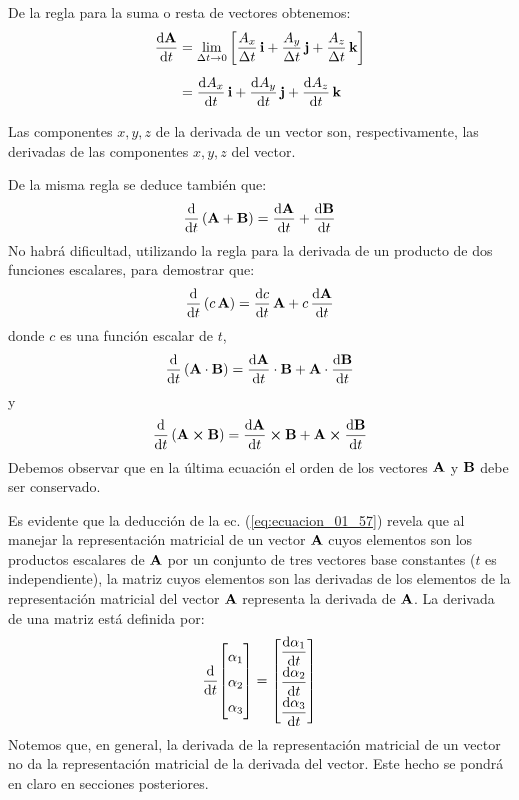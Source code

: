 \documentclass[12pt]{article}
\begin{document}
De la regla para la suma o resta de vectores obtenemos:
\begin{align}
\begin{aligned}
    \dv{\vb{A}}{t} &= \lim_{\Delta t \to 0} \left[ \dfrac{A_{x}}{\Delta t} \, \vb{i} + \dfrac{A_{y}}{\Delta t} \, \vb{j} + \dfrac{A_{z}}{\Delta t} \, \vb{k} \right] \\[0.5em]
&= \dv{A_{x}}{t} \, \vb{i} + \dv{A_{y}}{t} \, \vb{j} + \dv{A_{z}}{t} \, \vb{k} \\[0.5em]
\end{aligned}
\label{eq:ecuacion_01_57}
\end{align}
Las componentes $x, y, z$ de la derivada de un vector son, respectivamente, las derivadas de las componentes $x, y, z$ del vector.
\par
De la misma regla se deduce también que:
\begin{align}
    \dv{t} \left( \vb{A} + \vb{B} \right) = \dv{\vb{A}}{t} + \dv{\vb{B}}{t}
    \label{eq:ecuacion_01_58}
\end{align}
No habrá dificultad, utilizando la regla para la derivada de un producto de dos funciones escalares, para demostrar que:
\begin{align}
    \dv{t} \left( c\, \vb{A} \right) = \dv{c}{t} \, \vb{A} + c \, \dv{\vb{A}}{t}
    \label{eq:ecuacion_01_59}
\end{align}
donde $c$ es una función escalar de $t$,
\begin{align}
    \dv{t} \left( \vb{A} \cdot \vb{B} \right) = \dv{\vb{A}}{t} \cdot \vb{B} + \vb{A} \cdot \dv{\vb{B}}{t}
    \label{eq:ecuacion_01_60}
\end{align}
y
\begin{align}
    \dv{t} \left( \vb{A} \cp \vb{B} \right) = \dv{\vb{A}}{t} \cp \vb{B} + \vb{A} \cp \dv{\vb{B}}{t}
    \label{eq:ecuacion_01_61}
\end{align}
Debemos observar que en la última ecuación el orden de los vectores $\vb{A}$ y $\vb{B}$ debe ser conservado.
\par
Es evidente que la deducción de la ec. (\ref{eq:ecuacion_01_57}) revela que al manejar la representación matricial de un vector $\vb{A}$ cuyos elementos son los productos escalares de $\vb{A}$ por un conjunto de tres vectores base constantes ($t$ es independiente), la matriz cuyos elementos son las derivadas de los elementos de la representación matricial del vector $\vb{A}$ representa la derivada de $\vb{A}$. La derivada de una matriz está definida por:
\begin{align}
    \renewcommand{\arraystretch}{1.5}
    \dv{t} \mqty[ \alpha_{1} \\ \alpha_{2} \\ \alpha_{3} ] = \mqty[ \displaystyle \dv{\alpha_{1}}{t} \\[0.25em] \displaystyle \dv{\alpha_{2}}{t} \\[0.25em] \displaystyle \dv{\alpha_{3}}{t} ]
    \label{eq:ecuacion_01_62}
\end{align}
Notemos que, en general, la derivada de la representación matricial de un vector no da la representación matricial de la derivada del vector. Este hecho se pondrá en claro en secciones posteriores.
\end{document}
